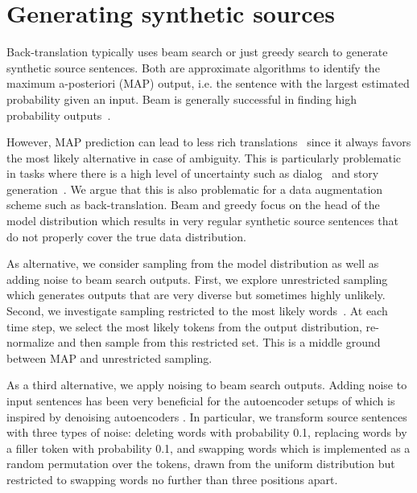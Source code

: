 \documentclass[11pt,a4paper]{article}
\begin{document}
\section{Generating synthetic sources}
\label{sec:genmethod}

Back-translation typically uses beam search \citep{sennrich:backtranslation:2016} or just greedy search \citep{lample:unsupervised:2018,lample:unsupervised2:2018} to generate synthetic source sentences.
Both are approximate algorithms to identify the maximum a-posteriori (MAP) output, i.e. the sentence with the largest estimated probability given an input.
Beam is generally successful in finding high probability outputs~\citep{ott:uncertainty:2018}.

However, MAP prediction can lead to less rich translations~\citep{ott:uncertainty:2018} since it always favors the most likely alternative in case of ambiguity. 
This is particularly problematic in tasks where there is a high level of uncertainty such as dialog~\cite{serban:dialog:2016} and story generation~\cite{fan:stories:2018}. 
We argue that this is also problematic for a data augmentation scheme such as back-translation. 
Beam and greedy focus on the head of the model distribution which results in very regular synthetic source sentences that do not properly cover the true data distribution.

As alternative, we consider sampling from the model distribution as well as adding noise to beam search outputs.
First, we explore unrestricted sampling which generates outputs that are very diverse but sometimes highly unlikely. 
Second, we investigate sampling restricted to the most likely words~\citep{graves:generating:2013,ott:uncertainty:2018,fan:stories:2018}. 
At each time step, we select the  most likely tokens from the output distribution, re-normalize and then sample from this restricted set. 
This is a middle ground between MAP and unrestricted sampling.

As a third alternative, we apply noising \citet{lample:unsupervised:2018} to beam search outputs. 
Adding noise to input sentences has been very beneficial for the autoencoder setups of \citep{lample:unsupervised:2018,hill:naacl:2016} which is inspired by denoising autoencoders \citep{vincent:2008:icml}.
In particular, we transform source sentences with three types of noise: deleting words with probability 0.1, replacing words by a filler token with probability 0.1, and swapping words which is implemented as a random permutation over the tokens, drawn from the uniform distribution but restricted to swapping words no further than three positions apart.
\end{document}
